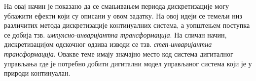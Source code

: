 На овај начин је показано да се смањивањем периода дискретизације могу ублажити ефекти који су описани у овом задатку. 
На овој идеји се темељи низ различитих метода дискретизације континуалних система, а уопштењем поступка се добија тзв. 
\textit{импулсно-инваријантна трансформација}. На сличан начин, дискретизацијом одскочног одзива изводи се 
тзв. \textit{степ-инваријантна трансформација}. Овакве теме имају значајно место код система дигиталног управљања где је потребно добити 
дигитални модел управљаног система који је у природи континуалан. 